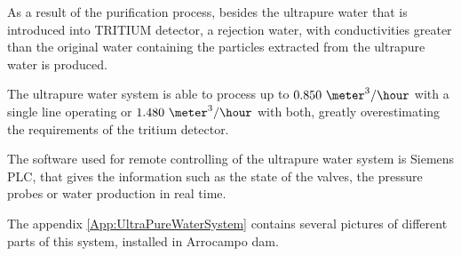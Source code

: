 As a result of the purification process, besides the ultrapure water that is introduced into TRITIUM detector, a rejection water, with conductivities greater than the original water containing the particles extracted from the ultrapure water is produced.

The ultrapure water system is able to process up to $0.850~\meter^3/\hour$ with a single line operating or $1.480~\meter^3/\hour$ with both, greatly overestimating the requirements of the tritium detector. 

The software used for remote controlling of the ultrapure water system is Siemens PLC, that gives the information such as the state of the valves, the pressure probes or water production in real time. 

The appendix \ref{App:UltraPureWaterSystem} contains several pictures of different parts of this system, installed in Arrocampo dam.
